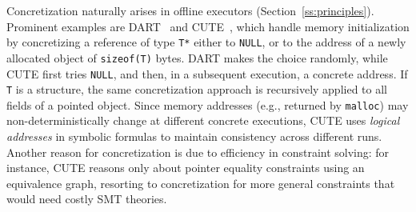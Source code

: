 Concretization naturally arises in offline executors (Section~\ref{ss:principles}). Prominent examples are {\sc DART}~\cite{DART-PLDI05} and {\sc CUTE}~\cite{CUTE-FSE05},
which handle memory initialization by concretizing a reference of type {\tt T*} either to {\tt NULL}, or to the address of a newly allocated object of {\tt sizeof(T)} bytes. DART makes the choice randomly, while CUTE first tries {\tt NULL}, and then, in a subsequent execution, a concrete address. If {\tt T} is a structure, the same concretization approach is recursively applied to all fields of a pointed object. Since memory addresses (e.g., returned by {\tt malloc}) may non-deterministically change at different concrete executions, CUTE uses {\em logical addresses} in symbolic formulas to maintain consistency across different runs.
Another reason for concretization is due to efficiency in constraint solving: for instance, CUTE reasons only about pointer equality constraints using an equivalence graph, resorting to concretization for more general constraints that would need costly SMT theories.





